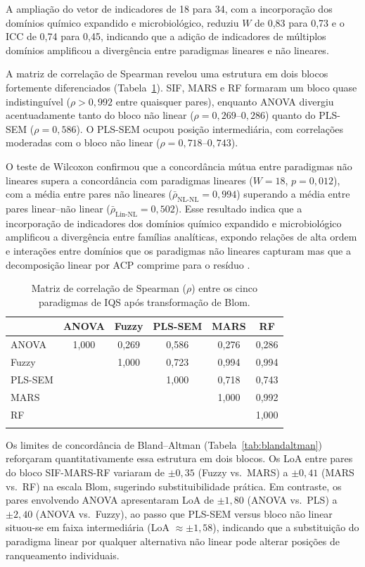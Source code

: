 \documentclass[pdflatex,sn-basic]{sn-jnl}%
\begin{document}
A ampliação do vetor de indicadores de 18 para 34, com a incorporação dos domínios químico expandido e microbiológico, reduziu $W$ de 0,83 para 0,73 e o ICC de 0,74 para 0,45, indicando que a adição de indicadores de múltiplos domínios amplificou a divergência entre paradigmas lineares e não lineares.

A matriz de correlação de Spearman revelou uma estrutura em dois blocos fortemente diferenciados (Tabela~\ref{tab:spearman}). SIF, MARS e RF formaram um bloco quase indistinguível ($\rho > 0{,}992$ entre quaisquer pares), enquanto ANOVA divergiu acentuadamente tanto do bloco não linear ($\rho = 0{,}269$--$0{,}286$) quanto do PLS-SEM ($\rho = 0{,}586$). O PLS-SEM ocupou posição intermediária, com correlações moderadas com o bloco não linear ($\rho = 0{,}718$--$0{,}743$).

O teste de Wilcoxon confirmou que a concordância mútua entre paradigmas não lineares supera a concordância com paradigmas lineares ($W = 18$, $p = 0{,}012$), com a média entre pares não lineares ($\bar{\rho}_{\text{NL-NL}} = 0{,}994$) superando a média entre pares linear--não linear ($\bar{\rho}_{\text{Lin-NL}} = 0{,}502$). Esse resultado indica que a incorporação de indicadores dos domínios químico expandido e microbiológico amplificou a divergência entre famílias analíticas, expondo relações de alta ordem e interações entre domínios que os paradigmas não lineares capturam mas que a decomposição linear por ACP comprime para o resíduo \citep{Zeraatpisheh2020}.

\begin{table}[ht]
\caption{Matriz de correlação de Spearman ($\rho$) entre os cinco paradigmas de IQS após transformação de Blom.}\label{tab:spearman}
\begin{tabular*}{\textwidth}{@{\extracolsep\fill}lccccc}
\toprule
 & ANOVA & Fuzzy & PLS-SEM & MARS & RF \\
\midrule
ANOVA   & 1,000 & 0,269 & 0,586 & 0,276 & 0,286 \\
Fuzzy   &       & 1,000 & 0,723 & 0,994 & 0,994 \\
PLS-SEM &       &       & 1,000 & 0,718 & 0,743 \\
MARS    &       &       &       & 1,000 & 0,992 \\
RF      &       &       &       &       & 1,000 \\
\botrule
\end{tabular*}
\end{table}

Os limites de concordância de Bland--Altman \citep{BlandAltman1986} (Tabela~\ref{tab:blandaltman}) reforçaram quantitativamente essa estrutura em dois blocos. Os LoA entre pares do bloco SIF-MARS-RF variaram de $\pm 0{,}35$ (Fuzzy vs.\ MARS) a $\pm 0{,}41$ (MARS vs.\ RF) na escala Blom, sugerindo substituibilidade prática. Em contraste, os pares envolvendo ANOVA apresentaram LoA de $\pm 1{,}80$ (ANOVA vs.\ PLS) a $\pm 2{,}40$ (ANOVA vs.\ Fuzzy), ao passo que PLS-SEM versus bloco não linear situou-se em faixa intermediária (LoA $\approx \pm 1{,}58$), indicando que a substituição do paradigma linear por qualquer alternativa não linear pode alterar posições de ranqueamento individuais.
\end{document}
